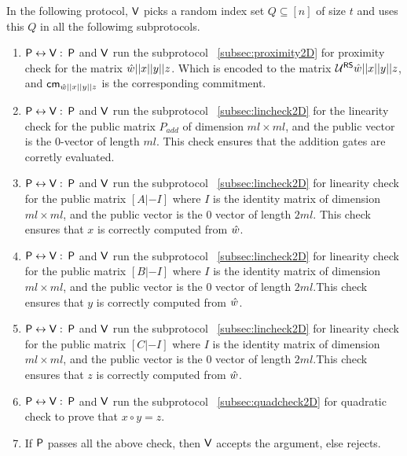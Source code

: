 In the following protocol, $\mathsf{V}$ picks a random index set $Q\subseteq [n]$ of size $t$ and uses this $Q$ in all the followimg subprotocols.
\begin{enumerate}
	\item $\mathsf{P} \leftrightarrow \mathsf{V}: $ $\mathsf{P}$ and $\mathsf{V}$ run the subprotocol ~\ref{subsec:proximity2D} for proximity check for the matrix $\hat{w}||x||y||z$. Which is encoded to the matrix $\mathcal{U}^{\mathsf{RS}}{\hat{w}||x||y||z}$, and $\mathsf{cm}_{\hat{w}||x||y||z}$ is the corresponding commitment.
	
	\item $\mathsf{P} \leftrightarrow \mathsf{V}: $ $\mathsf{P}$ and $\mathsf{V}$ run the subprotocol ~\ref{subsec:lincheck2D} for the linearity check for the public matrix $P_{add}$ of dimension $ml\times ml$, and the public vector is the 0-vector of length $ml$. This check ensures that the addition gates are corretly evaluated.
	
	\item $\mathsf{P} \leftrightarrow \mathsf{V}:$ $\mathsf{P}$ and $\mathsf{V}$ run the subprotocol ~\ref{subsec:lincheck2D} for linearity check for the public matrix $[A|-I]$ where $I$ is the identity matrix of dimension $ml \times ml$, and the public vector is the 0 vector of length $2ml$. This check ensures that $x$ is correctly computed from $\hat{w}$.
	
	\item $\mathsf{P} \leftrightarrow \mathsf{V}:$ $\mathsf{P}$ and $\mathsf{V}$ run the subprotocol ~\ref{subsec:lincheck2D} for linearity check for the public matrix $[B|-I]$ where $I$ is the identity matrix of dimension $ml \times ml$, and the public vector is the 0 vector of length $2ml$.This check ensures that $y$ is correctly computed from $\hat{w}$.
	
	\item $\mathsf{P} \leftrightarrow \mathsf{V}:$ $\mathsf{P}$ and $\mathsf{V}$ run the subprotocol ~\ref{subsec:lincheck2D} for linearity check for the public matrix $[C|-I]$ where $I$ is the identity matrix of dimension $ml \times ml$, and the public vector is the 0 vector of length $2ml$.This check ensures that $z$ is correctly computed from $\hat{w}$.
	
	\item $\mathsf{P} \leftrightarrow \mathsf{V}:$ $\mathsf{P}$ and $\mathsf{V}$ run the subprotocol ~\ref{subsec:quadcheck2D} for quadratic check to prove that $x \circ y = z$.
	
	\item If $\mathsf{P}$ passes all the above check, then $\mathsf{V}$ accepts the argument, else rejects.
\end{enumerate}

